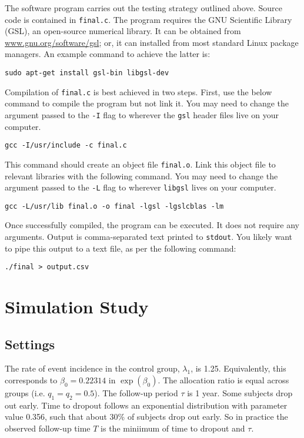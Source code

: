 \documentclass{article}
\begin{document}
The software program carries out the testing strategy outlined above. Source code is contained in \texttt{final.c}. 
The program requires the GNU Scientific Library (GSL), an
open-source numerical library. It can be obtained from
\url{www.gnu.org/software/gsl}; or, it can installed from most standard Linux
package managers. An example command to achieve the latter is:

\begin{center}
	\texttt{sudo apt-get install gsl-bin libgsl-dev}
\end{center}

Compilation of \texttt{final.c} is best achieved in two steps. First, use the below
command to compile the program but not link it. You may need to change the
argument passed to the \texttt{-I} flag to wherever the \texttt{gsl} header
files live on your computer. 

\begin{center}
	\texttt{gcc -I/usr/include -c final.c}
\end{center}

This command should create an object file \texttt{final.o}. Link this 
object file to relevant libraries with the following command.
You may need to change the argument passed to the \texttt{-L} flag to
wherever \texttt{libgsl} lives on your computer.

\begin{center}
	\texttt{gcc -L/usr/lib final.o -o final -lgsl -lgslcblas -lm}
\end{center}

Once successfully compiled, the program can be executed. It does not require any
arguments. Output is comma-separated text printed to \texttt{stdout}. You likely want to pipe this
output to a text file, as per the following command:

\begin{center}
	\texttt{./final > output.csv}
\end{center}

\section{Simulation Study}

\subsection{Settings}

The rate of event incidence in the control group, $\lambda_1$, is 1.25.
Equivalently, this corresponds to $\beta_0 = 0.22314$ in $\exp{(\beta_0)}$. The
allocation ratio is equal across groups (i.e. $q_1 = q_2 = 0.5$). The follow-up
period $\tau$ is 1 year. Some subjects drop out early. Time to dropout follows
an exponential distribution with parameter value 0.356, such that about 30\% of
subjects drop out early. So in practice the observed follow-up time $T$ is the
miniimum of time to dropout and $\tau$.
\end{document}
